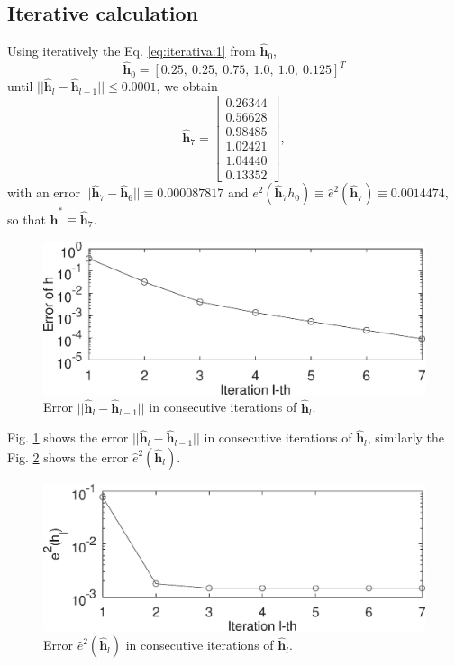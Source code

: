 \documentclass[11pt,twocolumn]{article}
\begin{document}
\subsection{Iterative calculation}

Using iteratively the Eq. \ref{eq:iterativa:1} from $\mathbf{\hat{h}}_0$,
\begin{equation}\label{eq:iterativa:h:0}
\mathbf{\hat{h}}_0=\left[0.25,~0.25,~0.75,~1.0,~1.0,~0.125\right]^{T}
\end{equation}
until $||\mathbf{\hat{h}}_{l}-\mathbf{\hat{h}}_{l-1}||\leq 0.0001$,
we obtain 
\begin{equation}
\mathbf{\hat{h}}_7 = \left[
\begin{matrix}
0.26344\\
0.56628\\
0.98485\\
1.02421\\
1.04440\\ 
0.13352
\end{matrix}
\right],
\end{equation}
with an error $||\mathbf{\hat{h}}_{7}-\mathbf{\hat{h}}_{6}||\equiv 0.000087817$ 
and $e^2(\mathbf{\hat{h}}_{7} h_0)\equiv \hat{e}^2(\mathbf{\hat{h}}_{7} )\equiv 0.0014474$, 
so that $\mathbf{\hat{h}^*} \equiv \mathbf{\hat{h}}_7 $.

\begin{figure}[ht!]
\centering
\includegraphics[width=0.950\columnwidth]{errorh.eps}
\caption{Error $||\mathbf{\hat{h}}_{l}-\mathbf{\hat{h}}_{l-1}||$ in consecutive iterations of $\mathbf{\hat{h}}_{l}$.}
\label{fig:errorh}
\end{figure}

Fig. \ref{fig:errorh} shows the error  $||\mathbf{\hat{h}}_{l}-\mathbf{\hat{h}}_{l-1}||$ in consecutive iterations of $\mathbf{\hat{h}}_{l}$,
similarly the Fig. \ref{fig:error} shows the error  $\hat{e}^2(\mathbf{\hat{h}}_{l} )$.


\begin{figure}[ht!]
\centering
\includegraphics[width=0.950\columnwidth]{error.eps}
\caption{Error $\hat{e}^2(\mathbf{\hat{h}}_{l})$ in consecutive iterations of $\mathbf{\hat{h}}_{l}$.}
\label{fig:error}
\end{figure}
\end{document}
